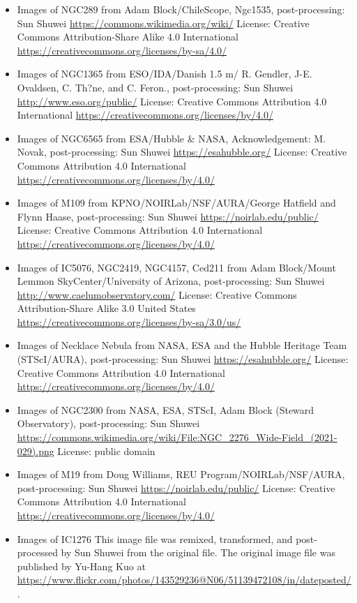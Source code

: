 \begin{itemize}
	 \url{https://esahubble.org/}
	 License: Creative Commons Attribution 4.0 International \url{https://creativecommons.org/licenses/by/4.0/}
\item Images of NGC289
	 from Adam Block/ChileScope, Ngc1535, post-processing: Sun Shuwei
	 \url{https://commons.wikimedia.org/wiki/}
	 License: Creative Commons Attribution-Share Alike 4.0 International \url{https://creativecommons.org/licenses/by-sa/4.0/}
\item Images of NGC1365
	 from ESO/IDA/Danish 1.5 m/ R. Gendler, J-E. Ovaldsen, C. Th?ne, and C. Feron., post-processing: Sun Shuwei
	 \url{http://www.eso.org/public/}
	 License: Creative Commons Attribution 4.0 International \url{https://creativecommons.org/licenses/by/4.0/}
\item Images of NGC6565
	 from ESA/Hubble \& NASA, Acknowledgement: M. Novak, post-processing: Sun Shuwei
	 \url{https://esahubble.org/}
	 License: Creative Commons Attribution 4.0 International \url{https://creativecommons.org/licenses/by/4.0/}
\item Images of M109
	 from KPNO/NOIRLab/NSF/AURA/George Hatfield and Flynn Haase, post-processing: Sun Shuwei
	 \url{https://noirlab.edu/public/}
	 License: Creative Commons Attribution 4.0 International \url{https://creativecommons.org/licenses/by/4.0/}
\item Images of IC5076, NGC2419, NGC4157, Ced211
	 from Adam Block/Mount Lemmon SkyCenter/University of Arizona, post-processing: Sun Shuwei
	 \url{http://www.caelumobservatory.com/}
	 License: Creative Commons Attribution-Share Alike 3.0 United States \url{https://creativecommons.org/licenses/by-sa/3.0/us/}
\item Images of Necklace Nebula
	 from NASA, ESA and the Hubble Heritage Team (STScI/AURA), post-processing: Sun Shuwei
	 \url{https://esahubble.org/}
	 License: Creative Commons Attribution 4.0 International \url{https://creativecommons.org/licenses/by/4.0/}
\item Images of NGC2300
	 from NASA, ESA, STScI, Adam Block (Steward Observatory), post-processing: Sun Shuwei
	 \url{https://commons.wikimedia.org/wiki/File:NGC_2276_Wide-Field_(2021-029).png}
	 License: public domain
\item Images of M19
	 from Doug Williams, REU Program/NOIRLab/NSF/AURA, post-processing: Sun Shuwei
	 \url{https://noirlab.edu/public/}
	 License: Creative Commons Attribution 4.0 International \url{https://creativecommons.org/licenses/by/4.0/}
\item Images of IC1276
	 This image file was remixed, transformed, and post-processed by Sun Shuwei from the original file. The original image file was published by Yu-Hang Kuo at \url{https://www.flickr.com/photos/143529236@N06/51139472108/in/dateposted/}.

\end{itemize}
